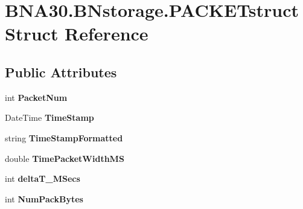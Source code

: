 \hypertarget{struct_b_n_a30_1_1_b_nstorage_1_1_p_a_c_k_e_tstruct}{}\section{B\+N\+A30.\+B\+Nstorage.\+P\+A\+C\+K\+E\+Tstruct Struct Reference}
\label{struct_b_n_a30_1_1_b_nstorage_1_1_p_a_c_k_e_tstruct}
\subsection*{Public Attributes}
\begin{DoxyCompactItemize}
\item 
\mbox{\label{struct_b_n_a30_1_1_b_nstorage_1_1_p_a_c_k_e_tstruct_a680b60805795ef327f2ada4eeda7c7fb}} 
int {\bfseries Packet\+Num}
\item 
\mbox{\label{struct_b_n_a30_1_1_b_nstorage_1_1_p_a_c_k_e_tstruct_a37a67c031f0ad39b9242b75836932f91}} 
Date\+Time {\bfseries Time\+Stamp}
\item 
\mbox{\label{struct_b_n_a30_1_1_b_nstorage_1_1_p_a_c_k_e_tstruct_ab2bab655bae62307b180e44f691ac19d}} 
string {\bfseries Time\+Stamp\+Formatted}
\item 
\mbox{\label{struct_b_n_a30_1_1_b_nstorage_1_1_p_a_c_k_e_tstruct_a7b837a35ffe0e7e92a8af284a5aa15ce}} 
double {\bfseries Time\+Packet\+Width\+MS}
\item 
\mbox{\label{struct_b_n_a30_1_1_b_nstorage_1_1_p_a_c_k_e_tstruct_a756be154694444164bea5649b6656505}} 
int {\bfseries delta\+T\+\_\+\+M\+Secs}
\item 
\mbox{\label{struct_b_n_a30_1_1_b_nstorage_1_1_p_a_c_k_e_tstruct_ad22fe79ac45e22afb2c292864e647ab5}} 
int {\bfseries Num\+Pack\+Bytes}
\item 
\mbox{\label{struct_b_n_a30_1_1_b_nstorage_1_1_p_a_c_k_e_tstruct_a532774f0d41806a749535326591f29a6}} 

\end{DoxyCompactItemize}
